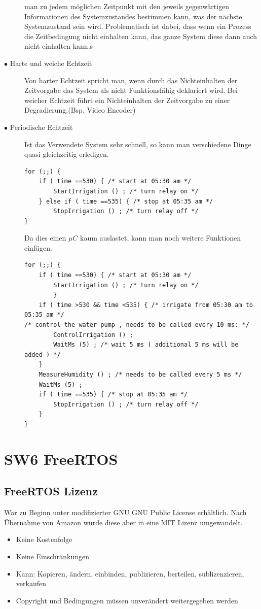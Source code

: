 \documentclass[a4paper, 8pt]{extarticle}
\begin{document}
\begin{multicols*}{3}
\begin{description}
						 man zu jedem möglichen Zeitpunkt mit den jeweils gegenwärtigen Informationen des Systemzustandes bestimmen kann, was der nächste Systemzustand sein wird.
						 Problematisch ist dabei, dass wenn ein Prozess die Zeitbedingung nicht einhalten kann, das ganze System diese dann auch nicht einhalten kann.s
					\item[$\bullet$ Harte und weiche Echtzeit]
						Von harter Echtzeit spricht man, wenn durch das Nichteinhalten der Zeitvorgabe das System als nicht Funktionsfähig deklariert wird. Bei weicher 
						Echtzeit führt ein Nichteinhalten der Zeitvorgabe zu einer Degradierung.(Bsp. Video Encoder)
					\item[$\bullet$ Periodische Echtzeit]
						Ist das Verwendete System sehr schnell, so kann man verschiedene Dinge quasi gleichzeitig erledigen.
							\begin{lstlisting}
for (;;) {
	if ( time ==530) { /* start at 05:30 am */
		StartIrrigation () ; /* turn relay on */
	} else if ( time ==535) { /* stop at 05:35 am */
		StopIrrigation () ; /* turn relay off */
}
							\end{lstlisting}
						Da dies einen $\mu C$ kaum auslastet, kann man noch weitere Funktionen einfügen.
							\begin{lstlisting}
for (;;) {
	if ( time ==530) { /* start at 05:30 am */
		StartIrrigation () ; /* turn relay on */
		}
	if ( time >530 && time <535) { /* irrigate from 05:30 am to 05:35 am */
/* control the water pump , needs to be called every 10 ms: */
		ControlIrrigation () ;
		WaitMs (5) ; /* wait 5 ms ( additional 5 ms will be added ) */
	}
	MeasureHumidity () ; /* needs to be called every 5 ms */
	WaitMs (5) ;
	if ( time ==535) { /* stop at 05:35 am */
		StopIrrigation () ; /* turn relay off */
	}
}
							\end{lstlisting} 						
				\end{description}
		\section{SW6 FreeRTOS}
			\subsection{FreeRTOS Lizenz}
				War zu Beginn unter modifizierter GNU GNU Public License erhältlich. Nach Übernahme von Amazon wurde diese aber
				in eine MIT Lizenz umgewandelt.
				\begin{itemize}
					\item Keine Kostenfolge
					\item Keine Einschränkungen
					\item Kann: Kopieren, ändern, einbinden, publizieren, berteilen, sublizenzieren, verkaufen
					\item Copyright und Bedingungen müssen unverändert weitergegeben werden
				\end{itemize}

\end{multicols*}
\end{document}

